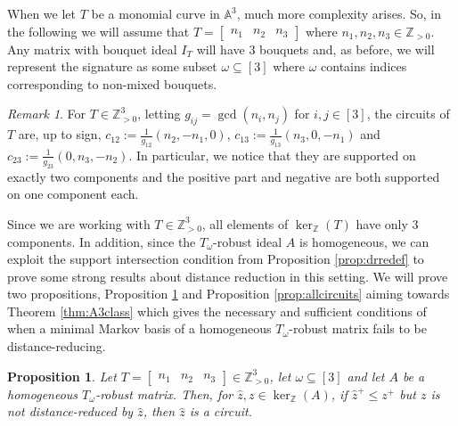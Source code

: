 \documentclass[a4paper, 12pt]{article}
\newcommand{\ZZ}{\mathbb Z}
\theoremstyle{plain}
\newtheorem{proposition}[theorem]{Proposition}
\theoremstyle{definition}
\theoremstyle{remark}
\newtheorem{remark}[theorem]{Remark}
\begin{document}
When we let $T$ be a monomial curve in $\mathbb{A}^3$, much more complexity arises.  So, in the following we will assume that $T=\begin{bmatrix}n_1 & n_2 & n_3\end{bmatrix}$ where $n_1,n_2,n_3 \in \ZZ_{>0}$. Any matrix with bouquet ideal $I_T$ will have $3$ bouquets and, as before, we will represent the signature as some subset $\omega \subseteq [3]$ where $\omega$ contains indices corresponding to non-mixed bouquets.

\begin{remark} \label{rem:circuitsA3}
For $T \in  \ZZ_{>0}^3$, letting $g_{ij}=\gcd(n_i,n_j)$ for $i,j \in [3]$, the circuits of $T$ are, up to sign, $c_{12}:=\frac{1}{g_{12}}(n_2,-n_1,0)$, $c_{13}:=\frac{1}{g_{13}}(n_3,0,-n_1)$ and $c_{23}:=\frac{1}{g_{23}}(0,n_3,-n_2)$. In particular, we notice that they are supported on exactly two components and the positive part and negative are both supported on one component each.
\end{remark}






Since we are working with $T \in \ZZ^3_{>0}$, all elements of $\ker_\ZZ(T)$ have only $3$ components. In addition, since the $T_{\omega}$-robust ideal $A$ is homogeneous, we can exploit the support intersection condition from Proposition \ref{prop:drredef} to prove some strong results about distance reduction in this setting.
We will prove two propositions, Proposition \ref{prop:A3circuitDR} and Proposition \ref{prop:allcircuits} aiming towards Theorem \ref{thm:A3class} which gives the necessary and sufficient conditions of when a minimal Markov basis of a homogeneous $T_{\omega}$-robust matrix fails to be distance-reducing. 


\begin{proposition} \label{prop:A3circuitDR}
    Let $T=\begin{bmatrix}
        n_1 & n_2 & n_3
    \end{bmatrix} \in  \ZZ_{>0}^3$, let $\omega \subseteq [3]$ and let $A$ be a homogeneous $T_{\omega}$-robust matrix. Then, for $\hat z,z \in \ker_\ZZ(A)$, if $\hat z^+ \le z^+$ but $z$ is not distance-reduced by $\hat z$, then $\hat z$ is a circuit.
\end{proposition}
\end{document}
